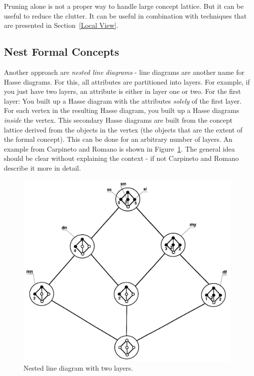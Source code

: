 \documentclass[11pt]{report}
\begin{document}
	Pruning alone is not a proper way to handle large concept lattice. But it can be useful to reduce the clutter. It can be useful in combination with techniques that are presented in Section~\ref{Local View}.
	
\subsection{Nest Formal Concepts}	

Another approach are \textit{nested line diagrams} - line diagrams are another name for Hasse diagrams. For this, all attributes are partitioned into layers. For example, if you just have two layers, an attribute is either in layer one or two. For the first layer: You built up a Hasse diagram with the attributes \textit{solely} of the first layer. For each vertex in the resulting Hasse diagram, you built up a Hasse diagrams \textit{inside} the vertex. This secondary Hasse diagrams are built from the concept lattice derived from the objects in the vertex (the objects that are the extent of the formal concept). This can be done for an arbitrary number of layers. An example from Carpineto and Romano \cite{carpineto2004concept} is shown in Figure~\ref{figure:nested}. The general idea should be clear without explaining the context - if not Carpineto and Romano \cite{carpineto2004concept} describe it more in detail. \\

\begin{figure}[!ht]
	\centering
	\includegraphics[width=\linewidth]{./images/nested}
\caption{Nested line diagram with two layers. \cite{carpineto2004concept}}
\label{figure:nested}
\end{figure}
	
\end{document}
